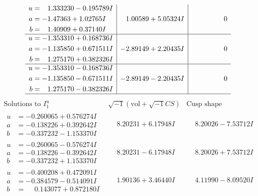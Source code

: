\documentclass[1p]{elsarticle_modified}
\theoremstyle{definition}
\newcommand{\I}{\sqrt{-1}}
\begin{document}
$$\begin{array}{c|c|c}
\begin{aligned}
u &= \phantom{-}1.333230 - 0.195789 I \\
a &= -1.47363 + 1.02765 I \\
b &= \phantom{-}1.40909 + 0.37140 I\end{aligned}
 & \phantom{-}1.00589 + 5.05324 I & \phantom{-0.000000 } 0 \\ \hline\begin{aligned}
u &= -1.353310 + 0.168736 I \\
a &= -1.135850 + 0.671511 I \\
b &= \phantom{-}1.275170 + 0.382326 I\end{aligned}
 & -2.89149 + 2.20435 I & \phantom{-0.000000 } 0 \\ \hline\begin{aligned}
u &= -1.353310 - 0.168736 I \\
a &= -1.135850 - 0.671511 I \\
b &= \phantom{-}1.275170 - 0.382326 I\end{aligned}
 & -2.89149 - 2.20435 I & \phantom{-0.000000 } 0\\
 \hline 
 \end{array}$$\newpage$$\begin{array}{c|c|c}  
\text{Solutions to }I^u_{1}& \I (\text{vol} + \sqrt{-1}CS) & \text{Cusp shape}\\
 \hline 
\begin{aligned}
u &= -0.260065 + 0.576274 I \\
a &= -0.138226 + 0.392642 I \\
b &= -0.337232 - 1.153370 I\end{aligned}
 & \phantom{-}8.20231 + 6.17948 I & \phantom{-}8.20026 - 7.53712 I \\ \hline\begin{aligned}
u &= -0.260065 - 0.576274 I \\
a &= -0.138226 - 0.392642 I \\
b &= -0.337232 + 1.153370 I\end{aligned}
 & \phantom{-}8.20231 - 6.17948 I & \phantom{-}8.20026 + 7.53712 I \\ \hline\begin{aligned}
u &= -0.400208 + 0.472091 I \\
a &= -0.384579 - 0.514091 I \\
b &= \phantom{-}0.143077 + 0.872180 I\end{aligned}
 & \phantom{-}1.90136 + 3.46440 I & \phantom{-}4.11990 - 8.09520 I \\ \hline\begin{aligned}

\end{aligned}
\end{array}$$
\end{document}
